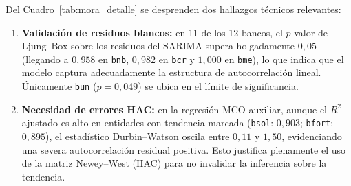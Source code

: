 \documentclass[11pt,letterpaper]{article}
\begin{document}
Del Cuadro~\ref{tab:mora_detalle} se desprenden dos hallazgos técnicos relevantes:
\begin{enumerate}[leftmargin=1.5em]
  \item \textbf{Validación de residuos blancos:} en 11 de los 12 bancos, el \(p\)-valor de Ljung--Box sobre los residuos del SARIMA supera holgadamente \(0{,}05\) (llegando a \(0{,}958\) en \texttt{bnb}, \(0{,}982\) en \texttt{bcr} y \(1{,}000\) en \texttt{bme}), lo que indica que el modelo captura adecuadamente la estructura de autocorrelación lineal. Únicamente \texttt{bun} (\(p = 0{,}049\)) se ubica en el límite de significancia.
  \item \textbf{Necesidad de errores HAC:} en la regresión MCO auxiliar, aunque el \(R^2\) ajustado es alto en entidades con tendencia marcada (\texttt{bsol}: \(0{,}903\); \texttt{bfort}: \(0{,}895\)), el estadístico Durbin--Watson oscila entre \(0{,}11\) y \(1{,}50\), evidenciando una severa autocorrelación residual positiva. Esto justifica plenamente el uso de la matriz Newey--West (HAC) para no invalidar la inferencia sobre la tendencia.
\end{enumerate}
\end{document}
